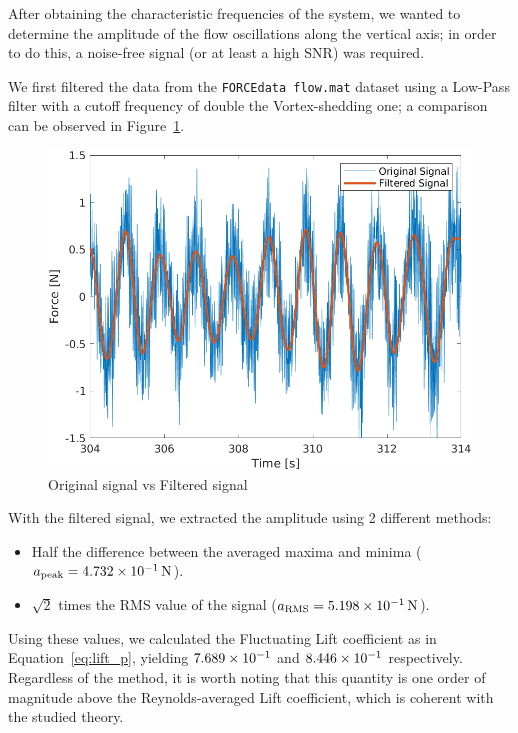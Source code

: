 \documentclass[12pt]{article}
\begin{document}
        After obtaining the characteristic frequencies of the system, we wanted to determine the amplitude of the flow oscillations along the vertical axis; in order to do this, a noise-free signal (or at least a high SNR) was required.
        
        We first filtered the data from the \texttt{FORCEdata flow.mat} dataset using a Low-Pass filter with a cutoff frequency of double the Vortex-shedding one; a comparison can be observed in Figure~\ref{fig:filtered}.

        \begin{figure}[ht!]
                \centering
                \includegraphics[width=\textwidth]{Filtered.png}
                \caption{Original signal vs Filtered signal}
                \label{fig:filtered}
        \end{figure}

        With the filtered signal, we extracted the amplitude using 2 different methods:

        \begin{itemize}
                \item Half the difference between the averaged maxima and minima ($a_\text{peak} = \SI{4.732E-1}{\newton}$).
                \item $\sqrt{2}$ times the RMS value of the signal ($a_\text{RMS} = \SI{5.198E-1}{\newton}$).
        \end{itemize}

        Using these values, we calculated the Fluctuating Lift coefficient as in Equation~\ref{eq:lift_p}, yielding $\num{7.689E-1}$ and $\num{8.446E-1}$ respectively. Regardless of the method, it is worth noting that this quantity is one order of magnitude above the Reynolds-averaged Lift coefficient, which is coherent with the studied theory.
\end{document}
